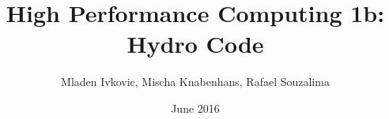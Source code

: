 \documentclass[8pt]{beamer}
\title{High Performance Computing 1b: Hydro Code}
\author{
	Mladen Ivkovic, Mischa Knabenhans, Rafael Souzalima
}
\date{June 2016}
\begin{document}
% 
% 
% 
% 
% 


\begin{frame}{}
	\titlepage
\end{frame}
\small
\end{document}
